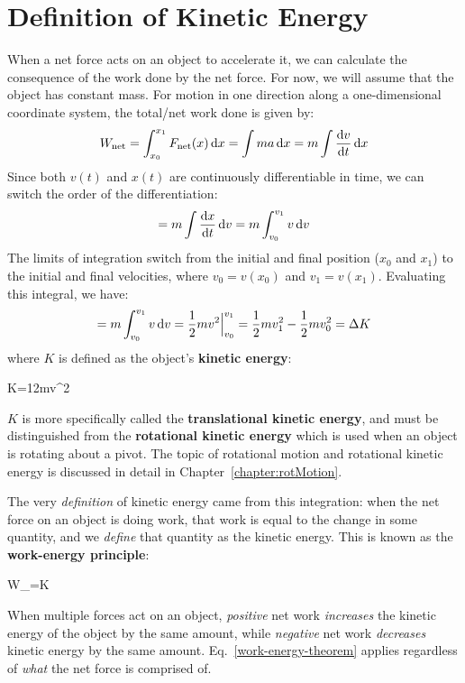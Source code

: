 \section{Definition of Kinetic Energy}
\label{sec:transKE}
When a net force acts on an object to accelerate it, we can calculate the
consequence of the work done by the net force. For now, we will assume that the
object has constant mass. For motion in one direction along a one-dimensional
coordinate system, the total/net work done is given by:
\begin{equation*}
  W_\text{net}
  =\int_{x_0}^{x_1}F_\text{net}(x)\dl x
  =\int ma\dl x
  =m\int\diff vt\dl x
\end{equation*}
Since both $v(t)$ and $x(t)$ are continuously differentiable in time, we can
switch the order of the differentiation:
\begin{equation*}
  =m\int\diff xt\dl v=m\int_{v_0}^{v_1}v\dl v
\end{equation*}
The limits of integration switch from the initial and final position ($x_0$ and
$x_1$) to the initial and final velocities, where $v_0=v(x_0)$ and
$v_1=v(x_1)$. Evaluating this integral, we have:
\begin{equation*}
  =m\int_{v_0}^{v_1}v\dl v
  =\frac12mv^2\Big|^{v_1}_{v_0}
  =\frac12mv_1^2-\frac12mv_0^2
  =\Delta K
\end{equation*}
where $K$ is defined as the object's \textbf{kinetic energy}:
\begin{important-equation}
  K=\frac12mv^2
  \label{eq:KE-definition}
\end{important-equation}
\begin{remark}
  $K$ is more specifically called the \textbf{translational kinetic energy},
  and must be distinguished from the \textbf{rotational kinetic energy} which
  is used when an object is rotating about a pivot. The topic of rotational
  motion and rotational kinetic energy is discussed in detail in
  Chapter~\ref{chapter:rotMotion}.
\end{remark}
The very \emph{definition} of kinetic energy came from this integration: when
the net force on an object is doing work, that work is equal to the change in
some quantity, and we \emph{define} that quantity as the kinetic energy. This
is known as the \textbf{work-energy principle}:
\begin{important-equation}
  W_=\Delta K
  \label{work-energy-theorem}
\end{important-equation}
When multiple forces act on an object, \emph{positive} net work
\emph{increases} the kinetic energy of the object by the same amount, while
\emph{negative} net work \emph{decreases} kinetic energy by the same amount.
Eq.~\ref{work-energy-theorem} applies regardless of \emph{what} the net force
is comprised of.

